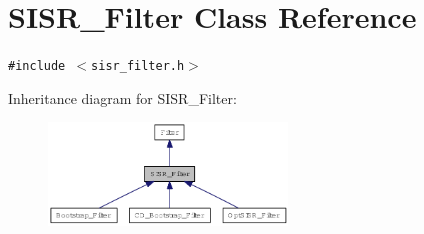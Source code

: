 \hypertarget{class_s_i_s_r___filter}{
\section{SISR\_\-Filter Class Reference}
\label{class_s_i_s_r___filter}
}
{\tt \#include $<$sisr\_\-filter.h$>$}

Inheritance diagram for SISR\_\-Filter:\nopagebreak
\begin{figure}[H]
\begin{center}
\leavevmode
\includegraphics[width=180pt]{class_s_i_s_r___filter__inherit__graph}
\end{center}
\end{figure}
